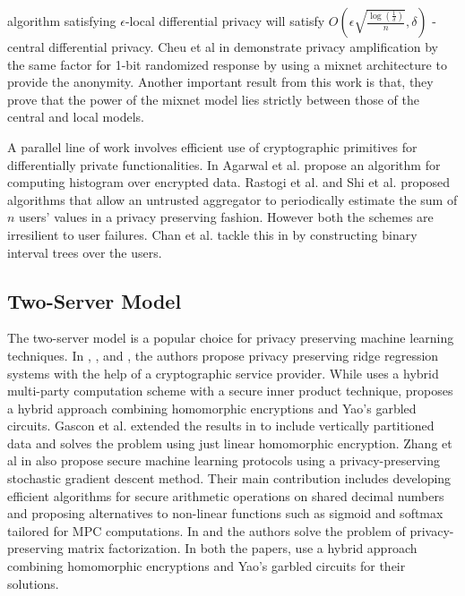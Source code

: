 algorithm satisfying $\epsilon$-local differential privacy will satisfy $O(\epsilon\sqrt{\frac{\log(\frac{1}{\delta})}{n}},\delta)$ -central differential
privacy. Cheu et al in \cite{mixnets} demonstrate privacy amplification by the same factor for 1-bit randomized response by using a mixnet architecture to provide the anonymity. Another important result from this work is that, they prove that the power of the mixnet model lies strictly between those of the central and local
models.
\par A parallel line of work involves efficient use of cryptographic primitives for differentially private
functionalities. In \cite{kamara}  Agarwal et al. propose an algorithm for computing histogram over encrypted data. Rastogi et al. \cite{Rastogi} and
Shi et al. \cite{Shi} proposed algorithms that allow an untrusted aggregator to periodically
estimate the sum of $n$ users' values in a  privacy preserving fashion. However both the schemes are irresilient to user failures. Chan et al. tackle this in \cite{Shi2} by constructing binary interval trees over the users.
\subsection{Two-Server Model}
The two-server model is a popular choice for privacy preserving machine learning techniques. In \cite{Boneh1}, \cite{LReg}, \cite{Ver} and \cite{Ridge2}, the authors propose privacy preserving ridge regression systems with the help of a cryptographic service provider. While \cite{Ridge2} uses a hybrid multi-party computation scheme with a secure inner product technique, \cite{Boneh1} proposes a hybrid approach combining homomorphic encryptions and Yao's garbled circuits. Gascon et al. \cite{Ver} extended the results in \cite{Boneh1} to include vertically partitioned data and \cite{LReg} solves the problem using just linear homomorphic encryption.  Zhang et al in \cite{secureML} also propose secure machine learning protocols using a privacy-preserving stochastic gradient descent method. Their main contribution includes developing efficient algorithms for secure arithmetic
operations on shared decimal numbers and proposing alternatives to non-linear
functions such as sigmoid and softmax tailored for MPC computations. 
In \cite{Boneh2} and \cite{Matrix2} the authors solve the problem of privacy-preserving matrix factorization. In both the papers, use a hybrid approach combining homomorphic encryptions and Yao's garbled circuits for their solutions. 

